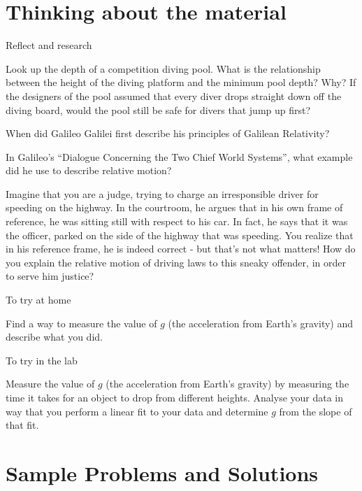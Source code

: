 \section{Thinking about the material}
\vspace{0.25cm}
\begin{chapteractivity}{Reflect and research}
{
\item Look up the depth of a competition diving pool. What is the relationship between the height of the diving platform and the minimum pool depth? Why? If the designers of the pool assumed that every diver drops straight down off the diving board, would the pool still be safe for divers that jump up first?
\item When did Galileo Galilei first describe his principles of Galilean Relativity?
\item In Galileo's ``Dialogue Concerning the Two Chief World Systems'', what example did he use to describe relative motion?
\item Imagine that you are a judge, trying to charge an irresponsible driver for speeding on the highway. In the courtroom, he argues that in his own frame of reference, he was sitting still with respect to his car. In fact, he says that it was the officer, parked on the side of the highway that was speeding. You realize that in his reference frame, he is indeed correct - but that's not what matters! How do you explain the relative motion of driving laws to this sneaky offender, in order to serve him justice?
}
\end{chapteractivity}


\begin{chapteractivity}{To try at home}
{
\item Find a way to measure the value of $g$ (the acceleration from Earth's gravity) and describe what you did.
}
\end{chapteractivity}

\begin{chapteractivity}{To try in the lab}
{
\item Measure the value of $g$ (the acceleration from Earth's gravity) by measuring the time it takes for an object to drop from different heights. Analyse your data in way that you perform a linear fit to your data and determine $g$ from the slope of that fit.
}
\end{chapteractivity}
\newpage
\section{Sample Problems and Solutions}
